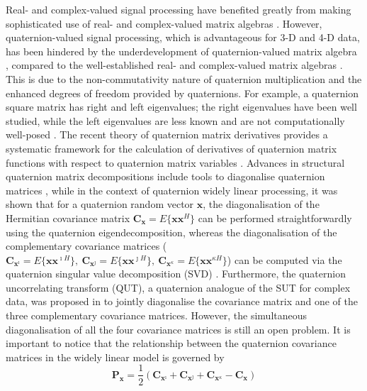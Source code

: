 \documentclass[review]{elsarticle}
\theoremstyle{plain}
\theoremstyle{remark}
\theoremstyle{plain}
\theoremstyle{definition}
\theoremstyle{prop}
\theoremstyle{definition}
\theoremstyle{plain}
\theoremstyle{plain}
\begin{document}
Real- and complex-valued signal processing have benefited greatly from making sophisticated use of real- and complex-valued matrix algebras \cite{bojanczyk,hjorungnes2011complex}. However, quaternion-valued signal processing, which is advantageous for 3-D and 4-D data, has been hindered by the underdevelopment of quaternion-valued matrix algebra \cite{Zhang1997}, compared to the well-established real- and complex-valued matrix algebras \cite{horn1990matrix,hjorungnes2011complex}. This is due to the non-commutativity nature of quaternion multiplication and the enhanced degrees of freedom provided by quaternions. For example, a quaternion square matrix has right and left eigenvalues; the right eigenvalues have been well studied, while the left eigenvalues are less known and are not computationally well-posed \cite{Zhang1997,zou2012location}. The recent theory of quaternion matrix derivatives provides a systematic framework for the calculation of derivatives of quaternion matrix functions with respect to quaternion matrix variables \cite{Xu2015a}. Advances in structural quaternion matrix decompositions include tools to diagonalise quaternion matrices \cite{Sangwine2006, Bihan2007}, while in the context of quaternion widely linear processing, it was shown that for a quaternion random vector $\mathbf{x}$, the diagonalisation of the Hermitian covariance matrix $\mathbf{C}_{\mathbf{x}}=E\{\mathbf{\mathbf{xx}}^{H}\}$ can be performed straightforwardly using the quaternion eigendecomposition, whereas the diagonalisation of the complementary covariance matrices ($\mathbf{C}_{\mathbf{x}^\imath}=E\{\mathbf{\mathbf{xx}}^{\imath H}\},~\mathbf{C}_{\mathbf{x}^\jmath}=E\{\mathbf{\mathbf{xx}}^{\jmath H}\},~\mathbf{C}_{\mathbf{x}^\kappa}=E\{\mathbf{\mathbf{xx}}^{\kappa H}\}$) can be computed via the quaternion singular value decomposition (SVD) \cite{CheongTook2011a}. Furthermore, the quaternion uncorrelating transform (QUT), a quaternion analogue of the SUT for complex data, was proposed in \cite{ShirinICASSP} to jointly diagonalise the covariance matrix and one of the three complementary covariance matrices. However, the simultaneous diagonalisation of all the four covariance matrices is still an open problem. It is important to notice that the relationship between the quaternion covariance matrices in the widely linear model is governed by \cite{CheongTook2011b} 
\begin{equation} \mathbf{P}_\mathbf{x}=\frac{1}{2}(\mathbf{C}_{\mathbf{x}^\imath}+\mathbf{C}_{\mathbf{x}^\jmath}+\mathbf{C}_{\mathbf{x}^\kappa}-\mathbf{C}_{\mathbf{x}})\label{eq: covariance relationship}
\end{equation}
\end{document}
